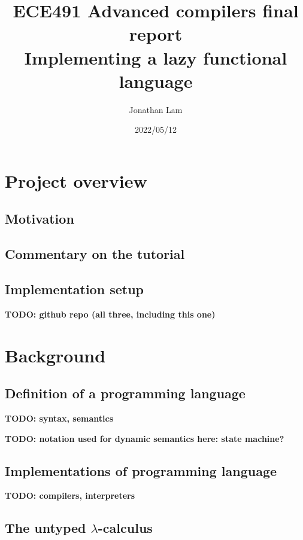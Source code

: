 \documentclass{article}
\title{
  ECE491 Advanced compilers final report \\
  Implementing a lazy functional language
}
\author{Jonathan Lam}
\date{2022/05/12}
\newcommand{\todo}[1]{\textbf{TODO: #1}}
\begin{document}
\maketitle{}

\tableofcontents{}

\section{Project overview}
\label{sec:overview}

\subsection{Motivation}
\label{sec:motivation}

\subsection{Commentary on the tutorial}
\label{sec:tutorial-commentary}

\subsection{Implementation setup}
\label{sec:implementation-setup}

\todo{github repo (all three, including this one)}

\section{Background}
\label{sec:background}

\subsection{Definition of a programming language}
\label{sec:pl-definition}

\todo{syntax, semantics}

\todo{notation used for dynamic semantics here: state machine?}

\subsection{Implementations of programming language}
\label{sec:pl-implementation}

\todo{compilers, interpreters}

\subsection{The untyped $\lambda$-calculus}
\label{sec:ulc}
\end{document}
